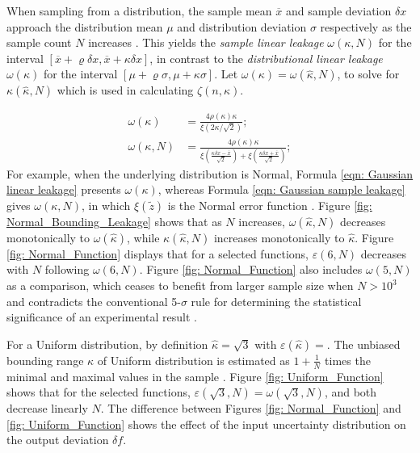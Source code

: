 \documentclass[twoside]{article}
\numberwithin{equation}{section}
\begin{document}
When sampling from a distribution, the sample mean $\overline{x}$ and sample deviation $\delta x$ approach the distribution mean $\mu$ and distribution deviation $\sigma$ respectively as the sample count $N$ increases \cite{Probability_Statistics}.
This yields the \emph{sample linear leakage} $\omega(\kappa, N)$ for the interval $[\overline{x} + \varrho \delta x, \overline{x} + \kappa \delta x]$, in contrast to the \emph{distributional linear leakage} $\omega(\kappa)$ for the interval $[\mu + \varrho \sigma, \mu + \kappa \sigma]$.
Let $\omega(\kappa) = \omega(\hat{\kappa}, N)$, to solve for $\kappa(\hat{\kappa}, N)$ which is used in calculating $\zeta(n, \kappa)$.

\begin{align}
\label{eqn: Gaussian linear leakage} 
\omega(\kappa) &= \frac{4 \rho(\kappa) \kappa}{\xi(2\kappa/\sqrt{2})}; \\
\label{eqn: Gaussian sample leakage}
\omega(\kappa, N) &= \frac{4 \rho(\kappa) \kappa}{\xi(\frac{\kappa \delta x - \overline{x}}{\sqrt{2}}) + \xi(\frac{\kappa \delta x + \overline{x}}{\sqrt{2}})};
\end{align}
For example, when the underlying distribution is Normal, Formula \eqref{eqn: Gaussian linear leakage} presents $\omega(\kappa)$, whereas Formula \eqref{eqn: Gaussian sample leakage} gives $\omega(\kappa, N)$, in which $\xi(\tilde{z})$ is the Normal error function \cite{Probability_Statistics}.
Figure \ref{fig: Normal_Bounding_Leakage} shows that as $N$ increases, $\omega(\hat{\kappa}, N)$ decreases monotonically to $\omega(\hat{\kappa})$, while $\kappa(\hat{\kappa}, N)$ increases monotonically to $\hat{\kappa}$. 
Figure \ref{fig: Normal_Function} displays that for a selected functions, $\varepsilon(6, N)$ decreases with $N$ following $\omega(6, N)$.
Figure \ref{fig: Normal_Function} also includes $\omega(5, N)$ as a comparison, which ceases to benefit from larger sample size when $N > {10}^{3}$ and contradicts the conventional 5-$\sigma$ rule for determining the statistical significance of an experimental result \cite{Statistical_Methods, Precisions_Physical_Measurements}. 

For a Uniform distribution, by definition $\hat{\kappa} = \sqrt{3}$ with $\varepsilon(\hat{\kappa}) = $.
The unbiased bounding range $\kappa$ of Uniform distribution is estimated as $1 + \frac{1}{N}$ times the minimal and maximal values in the sample \cite{Uniform_Distrobution_Estimator}.
Figure \ref{fig: Uniform_Function} shows that for the selected functions, $\varepsilon(\sqrt{3}, N) = \omega(\sqrt{3}, N)$, and both decrease linearly $N$.
The difference between Figures \ref{fig: Normal_Function} and \ref{fig: Uniform_Function} shows the effect of the input uncertainty distribution on the output deviation $\delta f$.
\end{document}
